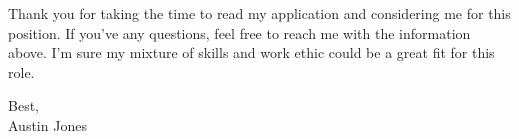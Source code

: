 \documentclass[a4paper,12pt]{article}
\begin{document}
Thank you for taking the time to read my application and considering me for this position.
If you've any questions, feel free to reach me with the information above.
I'm sure my mixture of skills and work ethic could be a great fit for this role.

Best, \\
Austin Jones
\end{document}
